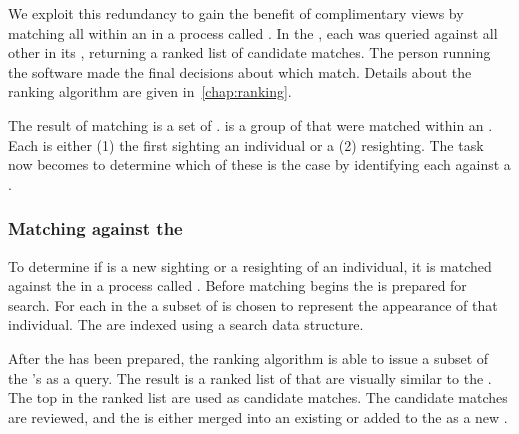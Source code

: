             We exploit this redundancy to gain the benefit of complimentary views by matching all \annots{} within an
            \occurrence{} in a process called . In the \GZC{}, each \annot{} was
            queried against all other \annots{} in its \occurrence{}, returning a ranked list of candidate matches. The
            person running the software made the final decisions about which \annots{} match. Details about the ranking
            algorithm are given in~\cref{chap:ranking}.

            The result of \intraoccurrence{} matching is a set of \glossterm{\encounters{}}. \Aan{\encounter{}} is a
            group of \annots{} that were matched within an \occurrence{}. Each \encounter{} is either (1) the first
            sighting an individual or a (2) resighting. The task now becomes to determine which of these is the case by
            identifying each \encounter{} against a \masterdatabase{}.

            \OccurrenceComplementFigure{}
 
        \subsubsection{Matching against the \masterdatabase{}} %
            To determine if \aan{\encounter{}} is a new sighting or a resighting of an individual, it is matched
            against the \masterdatabase{} in a process called . Before matching
            begins the \masterdatabase{} is prepared for search. For each \name{} in the \masterdatabase{} a subset
            of \glossterm{\exemplar{}} \annots{} is chosen to represent the appearance of that individual. The
            \exemplars{} are indexed using a search data structure.

            After the \masterdatabase{} has been prepared, the ranking algorithm is able to issue a subset of the
            \encounter{}'s \annots{} as a query. The result is a ranked list of \exemplars{} that are visually similar
            to the \encounter{}. The top \exemplars{} in the ranked list are used as candidate matches. The candidate
            matches are reviewed, and the \encounter{} is either merged into an existing \mastername{} or added to the
            \masterdatabase{} as a new \mastername{}.

